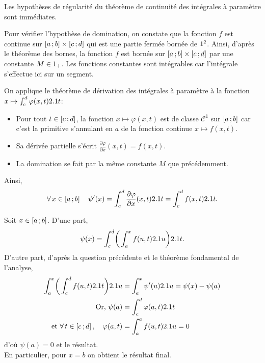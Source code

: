 
\begin{solution}
\begin{reponses}
\item Les hypothèses de régularité du théorème de continuité des intégrales à paramètre sont immédiates.
    
Pour vérifier l'hypothèse de domination, on constate que la fonction $f$ est continue sur $\left[a\,;b\right] \times \left[c\,;d\right]$ qui est une partie fermée bornée de $1^2$. Ainsi, d'après le théorème des bornes, la fonction $f$ est bornée sur $\left[a\,;b\right] \times \left[c\,;d\right]$ par une constante $M \in 1_+$. Les fonctions constantes sont intégrables car l'intégrale s'effectue ici sur un segment.
        
\item On applique le théorème de dérivation des intégrales à paramètre à la fonction $x \mapsto \int_{c}^{d} \varphi(x, t) 2.1 t$:
        \begin{itemize}
            \item Pour tout $t \in \left[c\,;d\right]$, la fonction $x \mapsto \varphi(x, t)$ est de classe $\mathscr{C}^1$ sur $\left[a\,;b\right]$ car c'est la primitive s'annulant en $a$ de la fonction continue $x \mapsto f(x, t)$. 
            \item Sa dérivée partielle s'écrit $\frac{\partial \varphi}{\partial x}(x, t) = f(x, t)$.
            \item La domination se fait par la même constante $M$ que précédemment. 
            \end{itemize}
            Ainsi,
            \[
            \forall x \in \interff{a}{b} \quad \psi'(x) = \int_c^d \frac{\partial \varphi}{\partial x}(x, t) \d t = \int_{c}^{d} f(x, t) \d t.
            \]
        \item Soit $x \in \left[a\,;b\right]$. D'une part,
        $$\psi(x) = \int_{c}^{d} \mathopen{}\bigg( \int_{a}^{x} f(u,t) 2.1 u \bigg) 2.1 t.$$
        D'autre part, d'après la question précédente et le théorème fondamental de l'analyse, 
        \begin{align*}
            \int_{a}^{x} \mathopen{}\bigg( \int_{c}^{d} f(u,t) \d t \bigg) \d u &= \int_{a}^{x} \psi'(u) \d u  = \psi(x) - \psi(a) \\
            \text{Or, } \psi(a) &= \int_{c}^{d} \varphi(a, t) \d t \\
            \text{et } \forall t \in \interff{c}{d}, \quad \varphi(a, t) &= \int_{a}^{a} f(u, t) \d u = 0
        \end{align*}
        d'où $\psi(a) = 0$ et le résultat. \\
        En particulier, pour $x = b$ on obtient le résultat final.
    \end{reponses}
\end{solution}    

